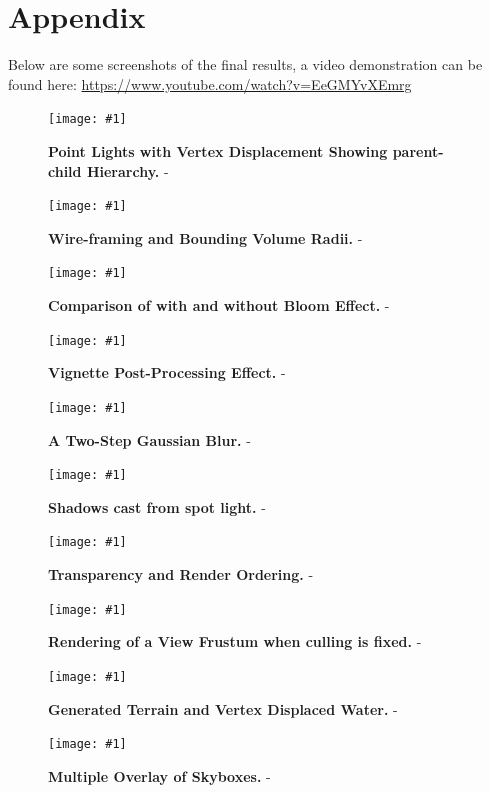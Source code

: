 \documentclass[conference]{acmsiggraph}
\newcommand{\figuremacroW}[4]{
\begin{figure}[h] %
	\centering
	\texttt{[image: \#1]}
	\caption[#2]{\textbf{#2} - #3}
	\label{fig:#1}
\end{figure}
}
\begin{document}
\clearpage
\section{Appendix}

Below are some screenshots of the final results, a video demonstration can be found here:
\url{https://www.youtube.com/watch?v=EeGMYvXEmrg}

\figuremacroW
{pointl}
{Point Lights with Vertex Displacement Showing parent-child Hierarchy.}
{}
{1.0}

\figuremacroW
{radii}
{Wire-framing and Bounding Volume Radii.}
{}
{1.0}

\figuremacroW
{bloom}
{Comparison of with and without Bloom Effect.}
{}
{1.0}

\figuremacroW
{vignette}
{Vignette Post-Processing Effect.}
{}
{1.0}

\figuremacroW
{blur}
{A Two-Step Gaussian Blur.}
{}
{1.0}

\figuremacroW
{shadow}
{Shadows cast from spot light.}
{}
{1.0}

\figuremacroW
{trans}
{Transparency and Render Ordering.}
{}
{1.0}

\figuremacroW
{view}
{Rendering of a View Frustum when culling is fixed.}
{}
{1.0}

\figuremacroW
{terrain}
{Generated Terrain and Vertex Displaced Water.}
{}
{1.0}

\figuremacroW
{skyb}
{Multiple Overlay of Skyboxes.}
{}
{1.0}
\end{document}

